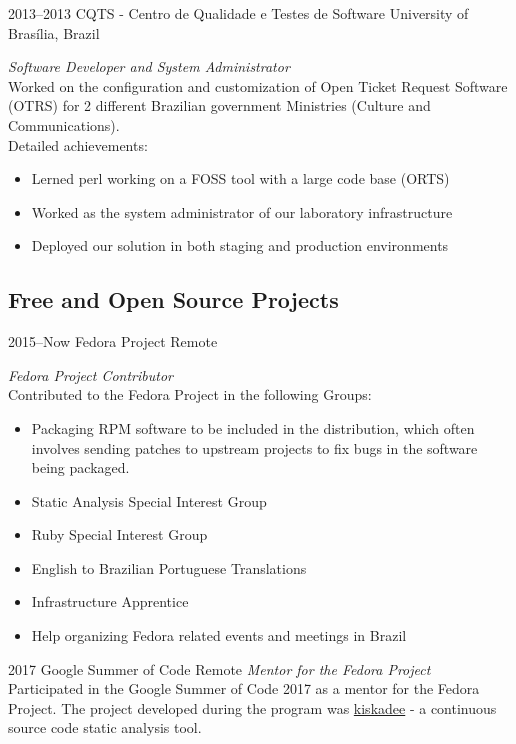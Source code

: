 \documentclass[]{friggeri-cv} %
\begin{document}
\begin{entrylist}
\entry
{2013--2013}
{CQTS - Centro de Qualidade e Testes de Software}
{University of Brasília, Brazil}
{\emph{Software Developer and System Administrator} \\
  Worked on the configuration and customization of Open Ticket Request Software (OTRS) for 2 different Brazilian government Ministries (Culture and Communications). \\
Detailed achievements:
\begin{itemize}
  \item Lerned perl working on a FOSS tool with a large code base (ORTS)
  \item Worked as the system administrator of our laboratory infrastructure
  \item Deployed our solution in both staging and production environments
\end{itemize}}

\end{entrylist}

\subsection{Free and Open Source Projects}

\begin{entrylist}

\entry
{2015--Now}
{Fedora Project}
{Remote}
{\emph{Fedora Project Contributor} \\
Contributed to the Fedora Project in the following Groups:
  \begin{itemize}
    \item Packaging RPM software to be included in the distribution, which often involves sending patches to upstream projects to fix bugs in the software being packaged.
    \item Static Analysis Special Interest Group
    \item Ruby Special Interest Group
    \item English to Brazilian Portuguese Translations
    \item Infrastructure Apprentice
    \item Help organizing Fedora related events and meetings in Brazil
  \end{itemize}}


\entry
{2017}
{Google Summer of Code}
{Remote}
{\emph{Mentor for the Fedora Project} \\
  Participated in the Google Summer of Code 2017 as a mentor for the Fedora Project. The project developed during the program was \href{pagure.io/kiskadee}{kiskadee} - a continuous source code static analysis tool.}


\end{entrylist}
\end{document}
